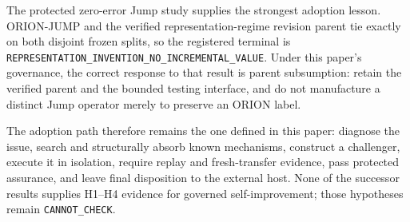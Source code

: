 The protected zero-error Jump study supplies the strongest adoption lesson. ORION-JUMP and the verified representation-regime revision parent tie exactly on both disjoint frozen splits, so the registered terminal is \texttt{REPRESENTATION\_INVENTION\_NO\_INCREMENTAL\_VALUE}. Under this paper's governance, the correct response to that result is parent subsumption: retain the verified parent and the bounded testing interface, and do not manufacture a distinct Jump operator merely to preserve an ORION label.

The adoption path therefore remains the one defined in this paper: diagnose the issue, search and structurally absorb known mechanisms, construct a challenger, execute it in isolation, require replay and fresh-transfer evidence, pass protected assurance, and leave final disposition to the external host. None of the successor results supplies H1--H4 evidence for governed self-improvement; those hypotheses remain \texttt{CANNOT\_CHECK}.